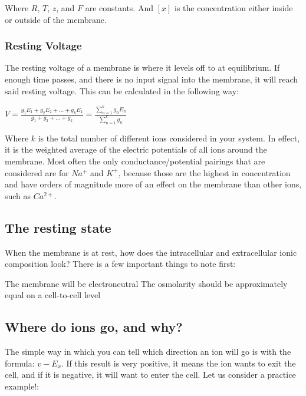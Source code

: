 \documentclass[12pt]{amsart}
\begin{document}
\medskip

Where $R$, $T$, $z$, and $F$ are constants. And $[x]$ is the concentration either inside or outside of the membrane.

\subsubsection{Resting Voltage} The resting voltage of a membrane is where it levels off to at equilibrium. If enough time passes, and there is no input signal into the membrane, it will reach said resting voltage. This can be calculated in the following way: 

\medskip

\begin{center}

    $V = \frac{g_1E_1 + g_2E_2 + ... + g_kE_k}{g_1 + g_2 + ... + g_k} = \frac{\sum_{n=1}^k g_nE_n}{\sum_{n=1}^k g_n}$
    
\end{center}

\medskip

Where $k$ is the total number of different ions considered in your system. In effect, it is the weighted average of the electric potentials of all ions around the membrane. Most often the only conductance/potential pairings that are considered are for $Na^+$ and $K^+$, because those are the highest in concentration and have orders of magnitude more of an effect on the membrane than other ions, such as $Ca^{2+}$.


\subsection{The resting state} When the membrane is at rest, how does the intracellular and extracellular ionic composition look? There is a few important things to note first:

\begin{outline}[enumerate]
\1 The membrane will be electroneutral
\1 The osmolarity should be approximately equal on a cell-to-cell level

\end{outline}

\subsection{Where do ions go, and why?} The simple way in which you can tell which direction an ion will go is with the formula: $v - E_x$. If this result is very positive, it means the ion wants to exit the cell, and if it is negative, it will want to enter the cell. Let us consider a practice example!: 
\end{document}
